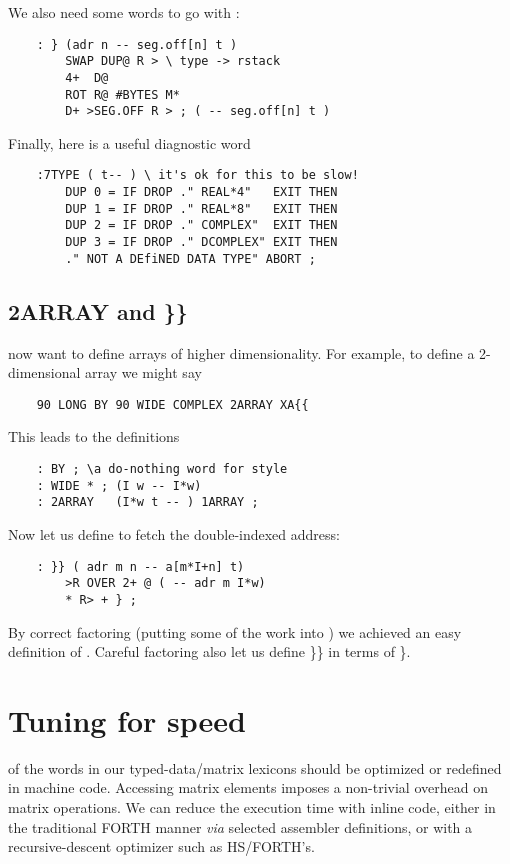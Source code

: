 We also need some words to go with :
\begin{lstlisting}
    : } (adr n -- seg.off[n] t )
        SWAP DUP@ R > \ type -> rstack
        4+  D@
        ROT R@ #BYTES M*
        D+ >SEG.OFF R > ; ( -- seg.off[n] t )
\end{lstlisting}

Finally, here is a useful diagnostic word

\begin{lstlisting}
    :7TYPE ( t-- ) \ it's ok for this to be slow!
        DUP 0 = IF DROP ." REAL*4"   EXIT THEN
        DUP 1 = IF DROP ." REAL*8"   EXIT THEN
        DUP 2 = IF DROP ." COMPLEX"  EXIT THEN
        DUP 3 = IF DROP ." DCOMPLEX" EXIT THEN
        ." NOT A DEfiNED DATA TYPE" ABORT ;
\end{lstlisting}

\subsection{2ARRAY and \}\} }
 now want to define arrays of higher dimensionality. For example, to define a 2-dimensional array we might say

\begin{lstlisting}
    90 LONG BY 90 WIDE COMPLEX 2ARRAY XA{{
\end{lstlisting}

This leads to the definitions
\begin{lstlisting}
    : BY ; \a do-nothing word for style
    : WIDE * ; (I w -- I*w)
    : 2ARRAY   (I*w t -- ) 1ARRAY ;
\end{lstlisting}

Now let us define \bc{\}\}} to fetch the double-indexed address:

\begin{lstlisting}
    : }} ( adr m n -- a[m*I+n] t)
        >R OVER 2+ @ ( -- adr m I*w)
        * R> + } ;
\end{lstlisting}

By correct factoring (putting some of the work into ) we achieved an easy definition of . Careful factoring also let
us define \}\} in terms of \}.

\section{Tuning for speed}

 of the words in our typed-data/matrix lexicons should be optimized or redefined in machine code. Accessing matrix elements imposes a non-trivial overhead on matrix operations. We can reduce the execution time with inline code, either in the traditional FORTH manner \textit{via} selected assembler definitions, or with a recursive-descent optimizer such as HS/FORTH's.

